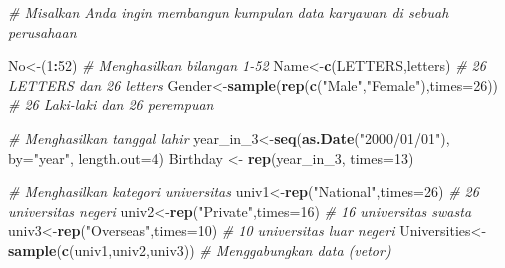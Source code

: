 \documentclass[
]{book}
\newenvironment{Shaded}{\begin{snugshade}}{\end{snugshade}}
\newcommand{\AttributeTok}[1]{\textcolor[rgb]{0.13,0.29,0.53}{#1}}
\newcommand{\CommentTok}[1]{\textcolor[rgb]{0.56,0.35,0.01}{\textit{#1}}}
\newcommand{\DecValTok}[1]{\textcolor[rgb]{0.00,0.00,0.81}{#1}}
\newcommand{\FunctionTok}[1]{\textcolor[rgb]{0.13,0.29,0.53}{\textbf{#1}}}
\newcommand{\NormalTok}[1]{#1}
\newcommand{\OtherTok}[1]{\textcolor[rgb]{0.56,0.35,0.01}{#1}}
\newcommand{\SpecialCharTok}[1]{\textcolor[rgb]{0.81,0.36,0.00}{\textbf{#1}}}
\newcommand{\StringTok}[1]{\textcolor[rgb]{0.31,0.60,0.02}{#1}}
\begin{document}
\begin{Shaded}
\begin{Highlighting}[]
\CommentTok{\# Misalkan Anda ingin membangun kumpulan data karyawan di sebuah perusahaan}

\NormalTok{No}\OtherTok{\textless{}{-}}\NormalTok{(}\DecValTok{1}\SpecialCharTok{:}\DecValTok{52}\NormalTok{)                                       }\CommentTok{\# Menghasilkan bilangan 1{-}52}
\NormalTok{Name}\OtherTok{\textless{}{-}}\FunctionTok{c}\NormalTok{(LETTERS,letters)                         }\CommentTok{\# 26 LETTERS dan 26 letters}
\NormalTok{Gender}\OtherTok{\textless{}{-}}\FunctionTok{sample}\NormalTok{(}\FunctionTok{rep}\NormalTok{(}\FunctionTok{c}\NormalTok{(}\StringTok{"Male"}\NormalTok{,}\StringTok{"Female"}\NormalTok{),}\AttributeTok{times=}\DecValTok{26}\NormalTok{)) }\CommentTok{\# 26 Laki{-}laki dan 26 perempuan}

\CommentTok{\# Menghasilkan tanggal lahir}
\NormalTok{year\_in\_3}\OtherTok{\textless{}{-}}\FunctionTok{seq}\NormalTok{(}\FunctionTok{as.Date}\NormalTok{(}\StringTok{"2000/01/01"}\NormalTok{), }\AttributeTok{by=}\StringTok{"year"}\NormalTok{, }\AttributeTok{length.out=}\DecValTok{4}\NormalTok{)}
\NormalTok{Birthday }\OtherTok{\textless{}{-}} \FunctionTok{rep}\NormalTok{(year\_in\_3, }\AttributeTok{times=}\DecValTok{13}\NormalTok{)}

\CommentTok{\# Menghasilkan kategori universitas}
\NormalTok{univ1}\OtherTok{\textless{}{-}}\FunctionTok{rep}\NormalTok{(}\StringTok{"National"}\NormalTok{,}\AttributeTok{times=}\DecValTok{26}\NormalTok{)                  }\CommentTok{\# 26 universitas negeri}
\NormalTok{univ2}\OtherTok{\textless{}{-}}\FunctionTok{rep}\NormalTok{(}\StringTok{"Private"}\NormalTok{,}\AttributeTok{times=}\DecValTok{16}\NormalTok{)                   }\CommentTok{\# 16 universitas swasta }
\NormalTok{univ3}\OtherTok{\textless{}{-}}\FunctionTok{rep}\NormalTok{(}\StringTok{"Overseas"}\NormalTok{,}\AttributeTok{times=}\DecValTok{10}\NormalTok{)                  }\CommentTok{\# 10 universitas luar negeri}
\NormalTok{Universities}\OtherTok{\textless{}{-}}\FunctionTok{sample}\NormalTok{(}\FunctionTok{c}\NormalTok{(univ1,univ2,univ3))       }\CommentTok{\# Menggabungkan data (vetor)}


\end{Highlighting}
\end{Shaded}
\end{document}
